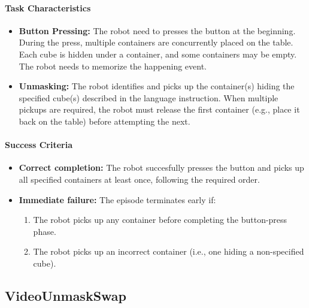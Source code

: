 \paragraph{Task Characteristics}
\begin{itemize}[itemsep=1pt, topsep=0pt, leftmargin=*]
    \item \textbf{Button Pressing:} The robot need to presses the button at the beginning. During the press, multiple containers are concurrently placed on the table. Each cube is hidden under a container, and some containers may be empty. The robot needs to memorize the happening event. 
    
    \item \textbf{Unmasking:} 
    The robot identifies and picks up the container(s) hiding the specified cube(s) described in the language instruction.  When multiple pickups are required, the robot must release the first container (e.g., place it back on the table) before attempting the next.
\end{itemize}

\paragraph{Success Criteria}
\begin{itemize}[itemsep=1pt, topsep=0pt, leftmargin=*]
    \item \textbf{Correct completion:} The robot succesfully presses the button and picks up all specified containers at least once, following the required order.
    
    \item \textbf{Immediate failure:} The episode terminates early if:
    \begin{enumerate}[itemsep=1pt, topsep=0pt, leftmargin=*]
        \item The robot picks up any container before completing the button-press phase.
        \item The robot picks up an incorrect container (i.e., one hiding a non-specified cube).
    \end{enumerate}
\end{itemize}



\clearpage



\subsection{VideoUnmaskSwap}
\label{sec:task_videounmaskswap}


